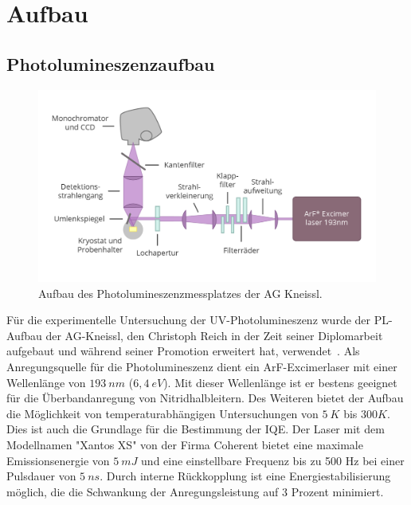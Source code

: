 
\chapter{Aufbau}


\thispagestyle{fancy}

\section{Photolumineszenzaufbau}
\begin{figure}[!htb]
    \centering
    \begin{minipage}[t]{\linewidth}
        \centering
        \includegraphics[width=0.8\linewidth]{Bilder/aufbauPL.png}
        \caption{Aufbau des Photolumineszenzmessplatzes der AG Kneissl. }
        \label{fig:wurtz}
    \end{minipage}%
\end{figure}
\noindent
Für die experimentelle Untersuchung der UV-Photolumineszenz wurde der PL-Aufbau der AG-Kneissl, den Christoph Reich in der Zeit seiner Diplomarbeit aufgebaut und während seiner Promotion erweitert hat, verwendet~\cite{creich}. 
Als Anregungsquelle für die Photolumineszenz dient ein ArF-Excimerlaser mit einer Wellenlänge von $193 \ nm$ ($6,4 \ eV$). Mit dieser Wellenlänge ist er bestens geeignet für die Überbandanregung von Nitridhalbleitern. 
Des Weiteren bietet der Aufbau die Möglichkeit von temperaturabhängigen Untersuchungen von $5 \ K $ bis $300 K$. Dies ist auch die Grundlage für die Bestimmung der IQE. 
\newline
Der Laser mit dem Modellnamen "Xantos XS" von der Firma Coherent bietet eine maximale Emissionsenergie von $ 5 \ mJ $ und eine einstellbare Frequenz bis zu 500 Hz bei einer Pulsdauer von $5 \ ns$.
Durch interne Rückkopplung ist eine Energiestabilisierung möglich, die die Schwankung der Anregungsleistung auf 3 Prozent minimiert. 
\newline
